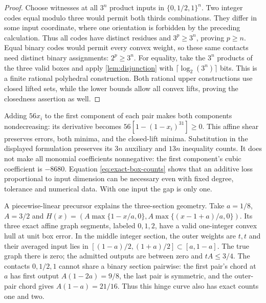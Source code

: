 \begin{proof}
Choose witnesses at all $3^n$ product inputs in $\{0,1/2,1\}^n$.
Two integer codes equal modulo three would permit both thirds
combinations. They differ in some input coordinate, where one orientation
is forbidden by the preceding calculation. Thus all codes have distinct
residues and $3^p\ge3^n$, proving $p\ge n$.
Equal binary codes would permit every convex weight, so these same
contacts need distinct binary assignments: $2^p\ge3^n$.
For equality, take the $3^n$ products of the three valid boxes and
apply \cref{lem:disjunction} with $\lceil\log_2(3^n)\rceil$ bits.
This is a finite rational polyhedral construction.
Both rational upper constructions use closed lifted sets, while the lower
bounds allow all convex lifts, proving the closedness assertion as well.
\end{proof}

Adding $56x_i$ to the first component of each pair makes both components
nondecreasing: its derivative becomes $56[1-(1-x_i)^{31}]\ge0$.
This affine shear preserves errors, both minima, and the closed-lift
minima. Substitution in the displayed formulation preserves its $3n$
auxiliary and $13n$ inequality counts. It does not make all monomial
coefficients nonnegative: the first component's cubic coefficient is $-8680$.
Equation \eqref{eq:exact-box-counts}
shows that an additive loss proportional to input dimension can be
necessary even with fixed degree, tolerance and numerical data. With one
input the gap is only one.

A piecewise-linear precursor explains the three-section geometry.
Take $a=1/8$, $A=3/2$ and
$H(x)=(A\max\{1-x/a,0\},A\max\{(x-1+a)/a,0\})$.
Its three exact affine graph segments, labeled $0,1,2$, have a valid
one-integer convex hull at unit box error. In the middle integer section,
the outer weights are $t,t$ and their averaged input lies in
$[(1-a)/2,(1+a)/2]\subset[a,1-a]$. The true graph there is zero;
the admitted outputs are between zero and $tA\le3/4$.
The contacts $0,1/2,1$ cannot share a binary section pairwise: the
first pair's chord at $a$ has first output $A(1-2a)=9/8$, the last
pair is symmetric, and the outer-pair chord gives $A(1-a)=21/16$.
Thus this hinge curve also has exact counts one and two.

